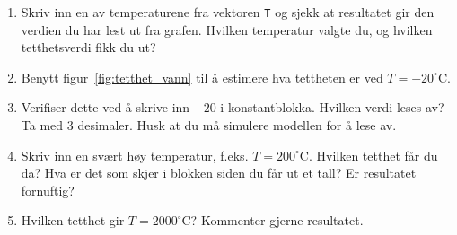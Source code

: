     \begin{enumerate}[label=i\arabic*)]
\item  Skriv inn en av temperaturene fra vektoren {\tt T} og sjekk at
    resultatet gir den verdien du har lest ut fra grafen. Hvilken
    temperatur valgte du, og hvilken tetthetsverdi fikk du ut?

  \item Benytt figur~\ref{fig:tetthet_vann} til å estimere hva tettheten
    er ved $T{=}-20^{\circ}$C. 
    
  \item Verifiser dette ved å skrive inn $-20$ i
    konstantblokka. Hvilken verdi leses av? Ta med 3 desimaler. Husk
    at du må simulere modellen for å lese av.

  \item Skriv inn en svært høy temperatur, f.eks. $T{=}200^{\circ}$C. Hvilken
    tetthet får du da? Hva er det som skjer i blokken siden du får ut et
    tall? Er resultatet fornuftig?

    \item Hvilken tetthet gir $T{=}2000^{\circ}$C? Kommenter gjerne resultatet.
    
  \end{enumerate}

